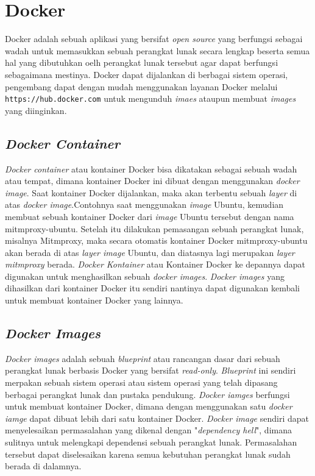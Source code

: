 \section{Docker}
Docker adalah sebuah aplikasi yang bersifat \textit{open source} yang berfungsi sebagai wadah untuk memasukkan sebuah perangkat lunak secara lengkap beserta semua hal yang dibutuhkan oelh perangkat lunak tersebut agar dapat berfungsi sebagaimana mestinya. Docker dapat dijalankan di berbagai sistem operasi, pengembang dapat dengan mudah menggunakan layanan Docker melalui \texttt{https://hub.docker.com} untuk mengunduh \textit{imaes} ataupun membuat \textit{images} yang diinginkan. \cite{bab2-docker}

\subsection{\textit{Docker Container}}
\textit{Docker container} atau kontainer Docker bisa dikatakan sebagai sebuah wadah atau tempat, dimana kontainer Docker ini dibuat dengan menggunakan \textit{docker image}. Saat kontainer Docker dijalankan, maka akan terbentu sebuah \textit{layer} di atas \textit{docker image}.Contohnya saat menggunakan \textit{image} Ubuntu, kemudian membuat sebuah kontainer Docker dari \textit{image} Ubuntu tersebut dengan nama mitmproxy-ubuntu. Setelah itu dilakukan pemasangan sebuah perangkat lunak, misalnya Mitmproxy, maka secara otomatis kontainer Docker mitmproxy-ubuntu akan berada di atas \textit{layer image} Ubuntu, dan diatasnya lagi merupakan \textit{layer mitmproxy} berada. \textit{Docker Kontainer} atau Kontainer Docker ke depannya dapat digunakan untuk menghasilkan sebuah \textit{docker images}. \textit{Docker images} yang dihasilkan dari kontainer Docker itu sendiri nantinya dapat digunakan kembali untuk membuat kontainer Docker yang lainnya.

\subsection{\textit{Docker Images}}
\textit{Docker images} adalah sebuah \textit{blueprint} atau rancangan dasar dari sebuah perangkat lunak berbasis Docker yang bersifat \textit{read-only}. \textit{Blueprint} ini sendiri merpakan sebuah sistem operasi atau sistem operasi yang telah dipasang berbagai perangkat lunak dan pustaka pendukung. \textit{Docker iamges} berfungsi untuk membuat kontainer Docker, dimana dengan menggunakan satu \textit{docker iamge} dapat dibuat lebih dari satu kontainer Docker. \textit{Docker image} sendiri dapat menyelesaikan permasalahan yang dikenal dengan "\textit{dependency hell}", dimana sulitnya untuk melengkapi dependensi sebuah perangkat lunak. Permasalahan tersebut dapat diselesaikan karena semua kebutuhan perangkat lunak sudah berada di dalamnya.

